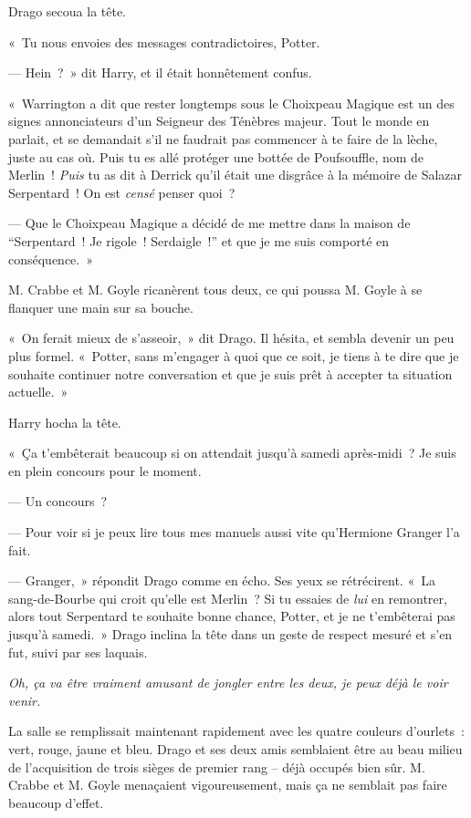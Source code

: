 Drago secoua la tête.

«~Tu nous envoies des messages contradictoires, Potter.

--- Hein~?~» dit Harry, et il était honnêtement confus.

«~Warrington a dit que rester longtemps sous le Choixpeau Magique est un des signes annonciateurs d'un Seigneur des Ténèbres majeur. Tout le monde en parlait, et se demandait s'il ne faudrait pas commencer à te faire de la lèche, juste au cas où. Puis tu es allé protéger une bottée de Poufsouffle, nom de Merlin~! \emph{Puis} tu as dit à Derrick qu'il était une disgrâce à la mémoire de Salazar Serpentard~! On est \emph{censé} penser quoi~?

--- Que le Choixpeau Magique a décidé de me mettre dans la maison de “Serpentard~! Je rigole~! Serdaigle~!” et que je me suis comporté en conséquence.~»

M. Crabbe et M. Goyle ricanèrent tous deux, ce qui poussa M. Goyle à se flanquer une main sur sa bouche.

«~On ferait mieux de s'asseoir,~» dit Drago. Il hésita, et sembla devenir un peu plus formel. «~Potter, sans m'engager à quoi que ce soit, je tiens à te dire que je souhaite continuer notre conversation et que je suis prêt à accepter ta situation actuelle.~»

Harry hocha la tête.

«~Ça t'embêterait beaucoup si on attendait jusqu'à samedi après-midi~? Je suis en plein concours pour le moment.

--- Un concours~?

--- Pour voir si je peux lire tous mes manuels aussi vite qu'Hermione Granger l'a fait.

--- Granger,~» répondit Drago comme en écho. Ses yeux se rétrécirent. «~La sang-de-Bourbe qui croit qu'elle est Merlin~? Si tu essaies de \emph{lui} en remontrer, alors tout Serpentard te souhaite bonne chance, Potter, et je ne t'embêterai pas jusqu'à samedi.~» Drago inclina la tête dans un geste de respect mesuré et s'en fut, suivi par ses laquais.

\emph{Oh, ça va être vraiment amusant de jongler entre les deux, je peux déjà le voir venir.}

La salle se remplissait maintenant rapidement avec les quatre couleurs d'ourlets~: vert, rouge, jaune et bleu. Drago et ses deux amis semblaient être au beau milieu de l'acquisition de trois sièges de premier rang -- déjà occupés bien sûr. M. Crabbe et M. Goyle menaçaient vigoureusement, mais ça ne semblait pas faire beaucoup d'effet.

